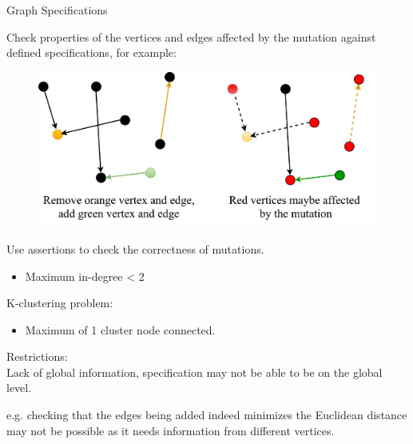 \begin{frame}{Graph Specifications}

Check properties of the vertices and edges affected by the mutation against
defined specifications, for example:

\begin{figure}
\includegraphics[width=0.8\linewidth]{figures/fig-specification1.pdf}
\end{figure}

Use assertions to check the correctness of mutations.

\begin{itemize}
  \item Maximum in-degree < 2
\end{itemize}

\end{frame}


\begin{frame}
K-clustering problem:
\begin{itemize}
  \item Maximum of 1 cluster node connected.  
\end{itemize}

Restrictions:\\
  Lack of global information, specification may not be able to be on the
  global level.
  
  e.g. checking that the edges being added indeed minimizes the Euclidean
  distance may not be possible as it needs information from different vertices.
\end{frame}

